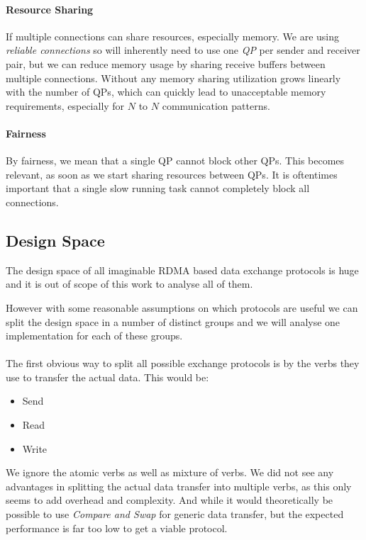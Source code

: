 
\paragraph{Resource Sharing} If multiple connections can share resources, especially memory. We are using \emph{reliable connections}
so will inherently need to use one \emph{QP} per sender and receiver pair, but we can reduce memory usage by sharing receive 
buffers between multiple connections. Without any memory sharing utilization grows linearly with the number of QPs, which 
can quickly lead to unacceptable memory requirements, especially for $N$ to $N$ communication patterns.

\paragraph{Fairness} By fairness, we mean that a single QP cannot block other QPs. This becomes relevant, as soon as we start
sharing resources between QPs. It is oftentimes important that a single slow running task cannot completely block all 
connections.


\pagebreak
\subsection{Design Space}

The design space of all imaginable RDMA based data exchange protocols is huge and it is out of scope of this work to 
analyse all of them. 

However with some reasonable assumptions on which protocols are useful we can split the design space 
in a number of distinct groups and we will analyse one implementation for each of these groups.


\paragraph{} The first obvious way to split all possible exchange protocols is by the verbs they use to transfer the actual data. 
This would be:
\begin{itemize}
  \item Send
  \item Read
  \item Write
\end{itemize}
We ignore the atomic verbs as well as mixture of verbs. We did not see any advantages in splitting the actual data transfer 
into multiple verbs, as this only seems to add overhead and complexity. And while it would theoretically be possible to use
\emph{Compare and Swap} for generic data transfer, but the expected performance is far too low to get a viable protocol.


